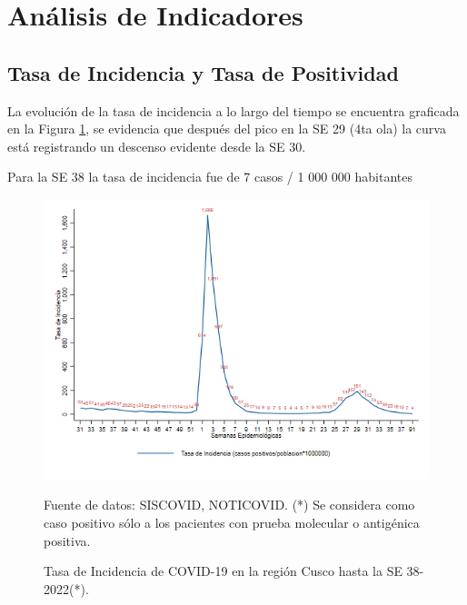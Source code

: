\documentclass[12pt,a4paper,openany]{book}
\begin{document}
	
	
	\clearpage
	
	\section*{Análisis de Indicadores}
	\subsection*{Tasa de Incidencia y Tasa de Positividad}
	\noindent La evolución de la tasa de incidencia a lo largo del tiempo se encuentra graficada en la Figura \ref{fig:incidencia}, se
	evidencia que después del pico en la SE 29 (4ta ola) la curva está registrando un descenso evidente desde la SE 30.
	
	Para la SE 38 la tasa de incidencia fue de 7 casos / 1 000 000 habitantes
	
	
	\begin{figure}[h]
		\caption{Tasa de Incidencia de COVID-19 en la región Cusco hasta la SE 38-2022(*).  }\label{fig:incidencia}
		\begin{center}
			\includegraphics[width=0.90\linewidth]{../figuras/tasa_incidencia_2021_2022.png}
		\end{center}
		{\footnotesize {Fuente de datos: SISCOVID, NOTICOVID. (*) Se considera como caso positivo sólo a los pacientes con prueba molecular o antigénica positiva.}}
	\end{figure}
	
\end{document}
